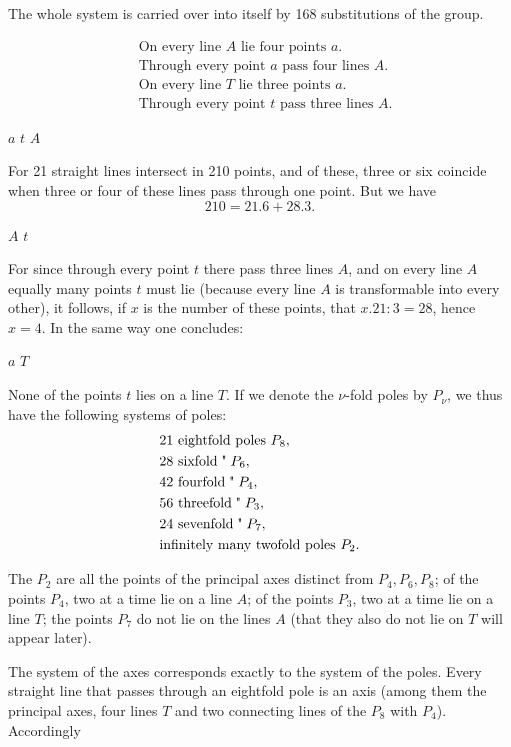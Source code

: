 The whole system is carried over into itself by 168 substitutions of the group.

\[
\begin{aligned}
&\text{On every line } A \text{ lie four points } a. \\
&\text{Through every point } a \text{ pass four lines } A. \\
&\text{On every line } T \text{ lie three points } a. \\
&\text{Through every point } t \text{ pass three lines } A.
\end{aligned}
\]

 $a$  $t$  $A$

For 21 straight lines intersect in 210 points, and of these, three or six coincide when three or four of these lines pass through one point. But we have
\[
210 = 21.6 + 28.3.
\]

 $A$  $t$

For since through every point $t$ there pass three lines $A$, and on every line $A$ equally many points $t$ must lie (because every line $A$ is transformable into every other), it follows, if $x$ is the number of these points, that $x . 21 : 3 = 28$, hence $x = 4$. In the same way one concludes:

 $a$  $T$

None of the points $t$ lies on a line $T$.
If we denote the $\nu$-fold poles by $P_\nu$, we thus have the following systems of poles:
\[
\begin{aligned}
&21 \text{ eightfold poles } P_8, \\
&28 \text{ sixfold} \;\text{\textquotedbl}\; P_6, \\
&42 \text{ fourfold} \;\text{\textquotedbl}\; P_4, \\
&56 \text{ threefold} \;\text{\textquotedbl}\; P_3, \\
&24 \text{ sevenfold} \;\text{\textquotedbl}\; P_7, \\
&\text{infinitely many twofold poles } P_2.
\end{aligned}
\]

The $P_2$ are all the points of the principal axes distinct from $P_4, P_6, P_8$; of the points $P_4$, two at a time lie on a line $A$; of the points $P_3$, two at a time lie on a line $T$; the points $P_7$ do not lie on the lines $A$ (that they also do not lie on $T$ will appear later).

The system of the axes corresponds exactly to the system of the poles. Every straight line that passes through an eightfold pole is an axis (among them the principal axes, four lines $T$ and two connecting lines of the $P_8$ with $P_4$). Accordingly
